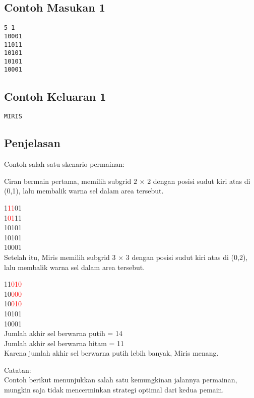 \documentclass{article}
\begin{document}
\begin{multicols}{2}
\subsection*{Contoh Masukan 1}
\begin{lstlisting}
5 1
10001
11011
10101
10101
10001
\end{lstlisting}
\columnbreak
\subsection*{Contoh Keluaran 1}
\begin{lstlisting}
MIRIS
\end{lstlisting}
\vfill
\null
\end{multicols}
\pagebreak

\subsection*{Penjelasan}

Contoh salah satu skenario permainan: 

Ciran bermain pertama, memilih subgrid $2$ × $2$ dengan posisi sudut kiri atas di (0,1), lalu membalik warna sel dalam area tersebut. 

1\textcolor{red}{11}01\\
1\textcolor{red}{01}11\\
10101\\
10101\\
10001\\

Setelah itu, Miris memilih subgrid $3$ × $3$ dengan posisi sudut kiri atas di (0,2), lalu membalik warna sel dalam area tersebut.

11\textcolor{red}{010}\\
10\textcolor{red}{000}\\
10\textcolor{red}{010}\\
10101\\
10001\\

Jumlah akhir sel berwarna putih = 14\\
Jumlah akhir sel berwarna hitam = 11\\
Karena jumlah akhir sel berwarna putih lebih banyak, Miris menang.

Catatan: \\
Contoh berikut menunjukkan salah satu kemungkinan jalannya permainan, mungkin saja tidak mencerminkan strategi optimal dari kedua pemain.
\end{document}
